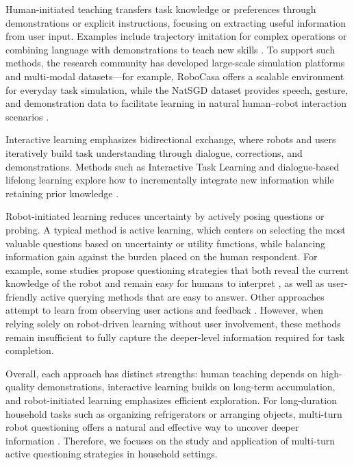 \documentclass[sigconf,authordraft]{acmart}
\begin{document}
Human-initiated teaching transfers task knowledge or preferences through demonstrations or explicit instructions, focusing on extracting useful information from user input. Examples include trajectory imitation for complex operations \cite{tsuji2025survey,hussein2017imitation,wake2024gpt}  or combining language with demonstrations to teach new skills \cite{she2014teaching}. To support such methods, the research community has developed large-scale simulation platforms and multi-modal datasets—for example, RoboCasa \cite{nasiriany2024robocasa} offers a scalable environment for everyday task simulation, while the NatSGD dataset provides speech, gesture, and demonstration data to facilitate learning in natural human–robot interaction scenarios \cite{shrestha2024natsgd}.

Interactive learning emphasizes bidirectional exchange, where robots and users iteratively build task understanding through dialogue, corrections, and demonstrations. Methods such as Interactive Task Learning  and dialogue-based lifelong learning explore how to incrementally integrate new information while retaining prior knowledge \cite{tyshka2023interactive,reimann2024survey,schmidt2018survey,luo2019learning,zheng2019personalized,lawley2024val} .

Robot-initiated learning reduces uncertainty by actively posing questions or probing. A typical method is active learning, which centers on selecting the most valuable questions based on uncertainty or utility functions, while balancing information gain against the burden placed on the human respondent. For example, some studies propose questioning strategies that both reveal the current knowledge of the robot and remain easy for humans to interpret \cite{habibian2022here}, as well as user-friendly active querying methods that are easy to answer\cite{biyik2019asking}. Other approaches attempt to learn from observing user actions and feedback \cite{wu2023tidybot}. However, when relying solely on robot-driven learning without user involvement, these methods remain insufficient to fully capture the deeper-level information required for task completion.

Overall, each approach has distinct strengths: human teaching depends on high-quality demonstrations, interactive learning builds on long-term accumulation, and robot-initiated learning emphasizes efficient exploration. For long-duration household tasks such as organizing refrigerators or arranging objects, multi-turn robot questioning offers a natural and effective way to uncover deeper information \cite{hunt2024survey}. Therefore, we focuses on the study and application of multi-turn active questioning strategies in household settings.
\end{document}
